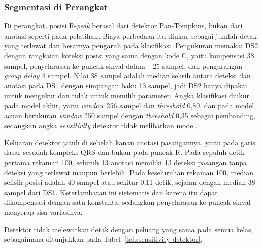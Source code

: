 \subsubsection{Segmentasi di Perangkat}

Di perangkat, posisi R-\textit{peak} berasal dari detektor Pan-Tompkins, bukan dari anotasi seperti pada pelatihan. Biaya perbedaan itu diukur sebagai jumlah detak yang terlewat dan besarnya pengaruh pada klasifikasi. Pengukuran memakai DS2 dengan rangkaian koreksi posisi yang sama dengan kode C, yaitu kompensasi 38 sampel, penyelarasan ke puncak sinyal dalam $\pm$25 sampel, dan pengurangan \textit{group delay} 4 sampel. Nilai 38 sampel adalah median selisih antara deteksi dan anotasi pada DS1 dengan simpangan baku 13 sampel, jadi DS2 hanya dipakai untuk mengukur dan tidak untuk memilih parameter. Angka klasifikasi diukur pada model akhir, yaitu \textit{window} 256 sampel dan \textit{threshold} 0,80, dan pada model acuan berukuran \textit{window} 250 sampel dengan \textit{threshold} 0,35 sebagai pembanding, sedangkan angka \textit{sensitivity} detektor tidak melibatkan model.

Keluaran detektor jatuh di sebelah kanan anotasi pasangannya, yaitu pada garis dasar sesudah kompleks QRS dan bukan pada puncak R. Pada sepuluh detik pertama rekaman 100, seluruh 13 anotasi memiliki 13 deteksi pasangan tanpa deteksi yang terlewat maupun berlebih. Pada keseluruhan rekaman 100, median selisih posisi adalah 40 sampel atau sekitar 0,11 detik, sejalan dengan median 38 sampel dari DS1. Keterlambatan ini sistematis dan karena itu dapat dikompensasi dengan satu konstanta, sedangkan penyelarasan ke puncak sinyal menyerap sisa variasinya.

Detektor tidak melewatkan detak dengan peluang yang sama pada semua kelas, sebagaimana ditunjukkan pada Tabel~\ref{tab:sensitivity-detektor}.

